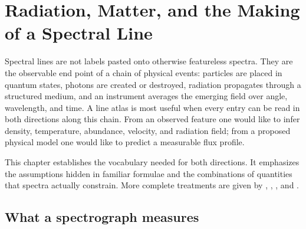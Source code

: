 
\chapter{Radiation, Matter, and the Making of a Spectral Line}
\label{chap:radiative-transfer-foundations}

Spectral lines are not labels pasted onto otherwise featureless spectra.  They are
the observable end point of a chain of physical events: particles are placed in
quantum states, photons are created or destroyed, radiation propagates through a
structured medium, and an instrument averages the emerging field over angle,
wavelength, and time.  A line atlas is most useful when every entry can be read in
both directions along this chain.  From an observed feature one would like to infer
density, temperature, abundance, velocity, and radiation field; from a proposed
physical model one would like to predict a measurable flux profile.

This chapter establishes the vocabulary needed for both directions.  It emphasizes
the assumptions hidden in familiar formulae and the combinations of quantities that
spectra actually constrain.  More complete treatments are given by
\citet{RybickiLightman1979}, \citet{Mihalas1978},
\citet{OsterbrockFerland2006}, and \citet{Draine2011}.

\section{What a spectrograph measures}

